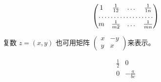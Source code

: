 \documentclass{ctexart}
\begin{document}
	
	\[
	\begin{pmatrix}
	1 & \frac{1}{12} & \dots & \frac{1}{1n} \\
	\hdotsfor{4} \\ %
	m & \frac{1}{m2} & \dots & \frac{1}{mn}
	\end{pmatrix}
	\]
	
	复数 $z=(x,y)$ 也可用矩阵
	\begin{math}
		\left(
		\begin{smallmatrix}
		x & -y \\
		y & x
		\end{smallmatrix}
		\right) 
	\end{math}来表示。
	
	\[
	\begin{array}{r|r}
	\frac12 & 0 \\
	\hline
	0 & -\frac a{bc}
	\end{array}
	\]
	
	
	
\end{document}
